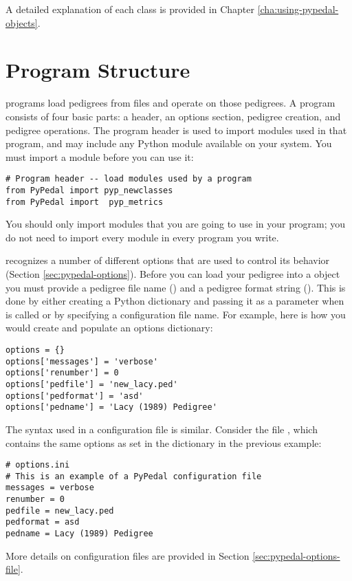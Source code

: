 A detailed explanation of each class is provided in Chapter \ref{cha:using-pypedal-objects}.
\section{Program Structure}
\label{sec:overview-program-structure}
\PyPedal{} programs load pedigrees from files and operate on those pedigrees.  A program consists of four basic parts: a header, an options section, pedigree creation, and pedigree operations.  The program header is used to import modules used in that program, and may include any Python module available on your system.  You must import a module before you can use it:
\begin{verbatim}
# Program header -- load modules used by a program
from PyPedal import pyp_newclasses
from PyPedal import  pyp_metrics
\end{verbatim}
You should only import modules that you are going to use in your program; you do not need to import every \PyPedal{} module in every program you write.

\PyPedal{} recognizes a number of different options that are used to control its behavior (Section \ref{sec:pypedal-options}).  Before you can load your pedigree into a \PyPedal{} object you must provide a pedigree file name () and a pedigree format string ().  This is done by either creating a Python dictionary and passing it as a parameter when  is called or by specifying a configuration file name.  For example, here is how you would create and populate an options dictionary:
\begin{verbatim}
options = {}
options['messages'] = 'verbose'
options['renumber'] = 0
options['pedfile'] = 'new_lacy.ped'
options['pedformat'] = 'asd'
options['pedname'] = 'Lacy (1989) Pedigree'
\end{verbatim}
The syntax used in a configuration file is similar.  Consider the file , which contains the same options as set in the  dictionary in the previous example:
\begin{verbatim}
# options.ini
# This is an example of a PyPedal configuration file
messages = verbose
renumber = 0
pedfile = new_lacy.ped
pedformat = asd
pedname = Lacy (1989) Pedigree
\end{verbatim}
More details on configuration files are provided in Section \ref{sec:pypedal-options-file}.

